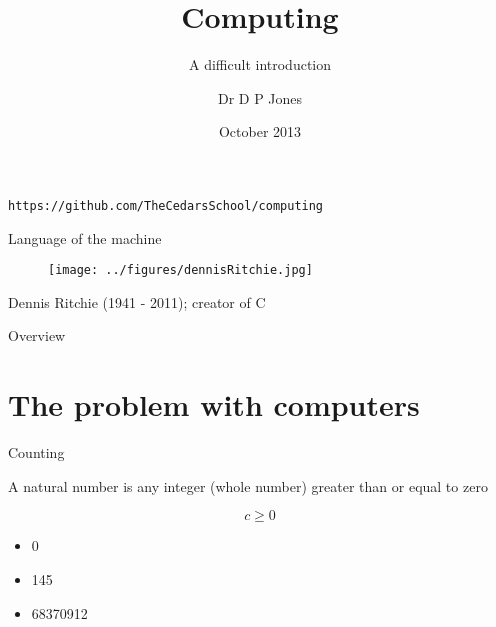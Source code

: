 \documentclass[xcolor=dvipsnames]{beamer}
\title{Computing}
\subtitle{A difficult introduction}
\author{Dr D P Jones}
\institute{The Cedars School}
\date{October 2013}
\begin{document}
\begin{frame}[plain]
  \titlepage

  \begin{center}
    \texttt{https://github.com/{\color{red}TheCedarsSchool}/{\color{blue}computing}}
  \end{center}
\end{frame}


\begin{frame}{Language of the machine}
  \begin{figure}
    \centering
    \texttt{[image: ../figures/dennisRitchie.jpg]}
  \end{figure}
  \begin{center}
    Dennis Ritchie (1941 - 2011); creator of C
  \end{center}
\end{frame}


\begin{frame}{Overview}
  \tableofcontents
\end{frame}


\section{The problem with computers}


\begin{frame}{Counting}
  \begin{definition}
    A natural number is any integer (whole number) greater than or equal to zero
  \end{definition}\pause

  \begin{equation*}
    c \ge 0
  \end{equation*}\pause

  \begin{example}
    \begin{itemize}
    \item 0
    \item 145
    \item 68370912
    \end{itemize}
  \end{example}
\end{frame}
\end{document}
